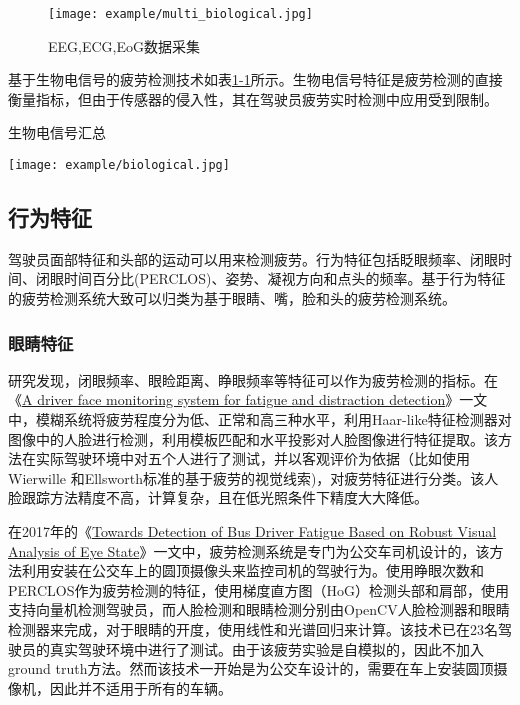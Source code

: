 \begin{figure}[!htp]

\centering
\texttt{[image: example/multi\_biological.jpg]}
\caption{EEG,ECG,EoG数据采集}
\label{fig:1-2}

\end{figure}

基于生物电信号的疲劳检测技术如表\href{table:1-1}{1-1}所示。生物电信号特征是疲劳检测的直接衡量指标，但由于传感器的侵入性，其在驾驶员疲劳实时检测中应用受到限制。

\begin{table}[!htp]

\centering
\caption{生物电信号汇总}
\texttt{[image: example/biological.jpg]}
\label{table:1-1}

\end{table}

\subsection{行为特征}

驾驶员面部特征和头部的运动可以用来检测疲劳。行为特征包括眨眼频率、闭眼时间、闭眼时间百分比(PERCLOS)、姿势、凝视方向和点头的频率。基于行为特征的疲劳检测系统大致可以归类为基于眼睛、嘴，脸和头的疲劳检测系统。

\subsubsection{眼睛特征}

研究发现，闭眼频率、眼睑距离、睁眼频率等特征可以作为疲劳检测的指标。在《\href{https://xueshu.baidu.com/usercenter/paper/show?paperid=42c02572346008a3b76421d3d2e499a5&site=xueshu_se&hitarticle=1}{A driver face monitoring system for fatigue and distraction detection}》一文中，模糊系统将疲劳程度分为低、正常和高三种水平，利用Haar-like特征检测器对图像中的人脸进行检测，利用模板匹配和水平投影对人脸图像进行特征提取。该方法在实际驾驶环境中对五个人进行了测试，并以客观评价为依据（比如使用Wierwille 和Ellsworth标准的基于疲劳的视觉线索)，对疲劳特征进行分类。该人脸跟踪方法精度不高，计算复杂，且在低光照条件下精度大大降低。

在2017年的《\href{https://xueshu.baidu.com/usercenter/paper/show?paperid=2e0968b70318946da955342ec643266a&site=xueshu_se}{Towards Detection of Bus Driver Fatigue Based on Robust Visual Analysis of Eye State}》一文中，疲劳检测系统是专门为公交车司机设计的，该方法利用安装在公交车上的圆顶摄像头来监控司机的驾驶行为。使用睁眼次数和PERCLOS作为疲劳检测的特征，使用梯度直方图（HoG）检测头部和肩部，使用支持向量机检测驾驶员，而人脸检测和眼睛检测分别由OpenCV人脸检测器和眼睛检测器来完成，对于眼睛的开度，使用线性和光谱回归来计算。该技术已在23名驾驶员的真实驾驶环境中进行了测试。由于该疲劳实验是自模拟的，因此不加入ground truth方法。然而该技术一开始是为公交车设计的，需要在车上安装圆顶摄像机，因此并不适用于所有的车辆。

